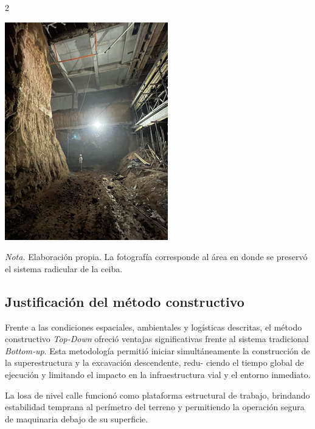 \documentclass[12pt,spanish,Letterpaper,openany]{book}
\begin{document}
\begin {multicols}{2}
\begin {flushleft}
\begin{minipage}[c]{\columnwidth}
\begin{center}\includegraphics[width=0.65\linewidth]{imagenes_articulos/art02_02} \end{center}

\emph{Nota.} Elaboración propia. La fotografía corresponde al área en donde se preservó el sistema radicular de la ceiba.

\end{minipage}
\end {flushleft}

\hypertarget{justificaciuxf3n-del-muxe9todo-constructivo}{%
\subsection{Justificación del método constructivo}\label{justificaciuxf3n-del-muxe9todo-constructivo}}

Frente a las condiciones espaciales, ambientales y logísticas descritas, el método constructivo \emph{Top-Down} ofreció ventajas significativas frente al sistema tradicional \emph{Bottom-up}. Esta metodología permitió iniciar simultáneamente la construcción de la superestructura y la excavación descendente, redu-
ciendo el tiempo global de ejecución y limitando el impacto en la infraestructura vial y el entorno inmediato.

La losa de nivel calle funcionó como plataforma estructural de trabajo, brindando estabilidad temprana al perímetro del terreno y permitiendo la operación segura de maquinaria debajo de su superficie.


\end{multicols}
\end{document}
